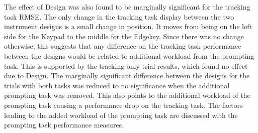 The effect of Design was also found to be marginally significant for the tracking task RMSE.
The only change in the tracking task display between the two instrument designs is a small change in position.
It moves from being on the left side for the Keypad to the middle for the Edgekey.
Since there was no change otherwise, this suggests that any difference on the tracking task performance between the designs would be related to additional workload from the prompting task.
This is supported by the tracking only trial results, which found no effect due to Design.
The marginally significant difference between the designs for the trials with both tasks was reduced to no significance when the additional prompting task was removed.
This also points to the additional workload of the prompting task causing a performance drop on the tracking task.
The factors leading to the added workload of the prompting task are discussed with the prompting task performance measures.



